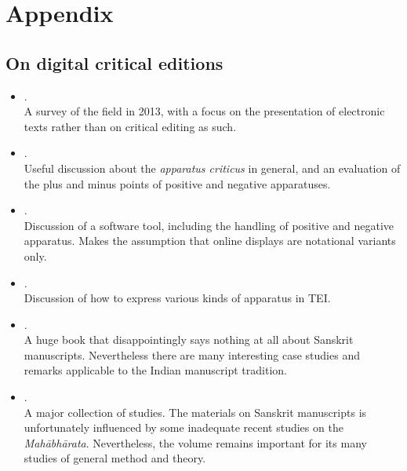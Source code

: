 \section*{Appendix}
\subsection{On digital critical editions}

\begin{itemize}
    \item {}. \\ A survey of the field in 2013, with a focus on
    the presentation of electronic texts rather than on critical editing as such.
    
    \item {}. \\ Useful discussion about the \emph{apparatus criticus}
    in general, and an evaluation of the plus and minus points of positive and
    negative apparatuses. 
    
    \item {}. \\ Discussion of a software tool, including the
    handling of positive and negative apparatus.  Makes the assumption that online
    displays are notational variants only.
    
    \item {}.  \\ Discussion of how to express various kinds of apparatus in 
    TEI.
    
    \item {}. \\ A huge book that disappointingly says nothing at all about 
    Sanskrit manuscripts.  Nevertheless there are many interesting case studies and remarks 
    applicable to the Indian manuscript tradition.
    
    \item {}. \\ A major collection of studies.  The materials on Sanskrit 
    manuscripts is unfortunately influenced by some inadequate recent studies on the 
    \emph{Mahābhārata}.  Nevertheless, the volume remains important for its many 
    studies of general method and theory.
    
\end{itemize}

